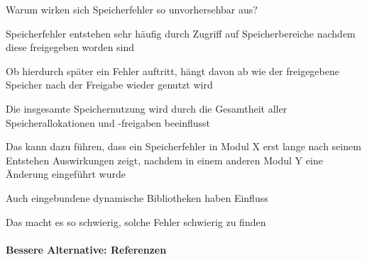 \documentclass[10pt]{article}
\begin{document}
Warum wirken sich Speicherfehler so unvorhersehbar aus?
\begin{itemize*}
  \item Speicherfehler entstehen sehr häufig durch Zugriff auf Speicherbereiche nachdem diese freigegeben worden sind
  \item Ob hierdurch später ein Fehler auftritt, hängt davon ab wie der freigegebene Speicher nach der Freigabe wieder genutzt wird
  \item Die insgesamte Speichernutzung wird durch die Gesamtheit aller Speicherallokationen und -freigaben beeinflusst
  \item Das kann dazu führen, dass ein Speicherfehler in Modul X erst lange nach seinem Entstehen Auswirkungen zeigt, nachdem in einem anderen Modul Y eine Änderung eingeführt wurde
  \item Auch eingebundene dynamische Bibliotheken haben Einfluss
  \item Das macht es so schwierig, solche Fehler schwierig zu finden
\end{itemize*}

\paragraph{Bessere Alternative: Referenzen}
\end{document}
